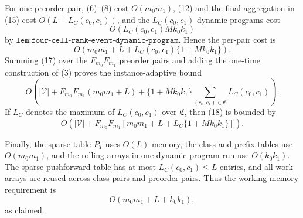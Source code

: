 For one preorder pair, (6)--(8) cost \(O(m_0m_1)\), (12) and the final aggregation in (15) cost \(O(L+L_C(c_0,c_1))\), and the \(L_C(c_0,c_1)\) dynamic programs cost
\[
O\!\left(L_C(c_0,c_1)Mk_0k_1\right)
\tag{16}
\]
by \(\texttt{lem:four-cell-rank-event-dynamic-program}\). Hence the per-pair cost is
\[
O\!\left(m_0m_1+L+
L_C(c_0,c_1)\{1+Mk_0k_1\}\right).
\tag{17}
\]
Summing (17) over the \(F_{m_0}F_{m_1}\) preorder pairs and adding the one-time construction of (3) proves the instance-adaptive bound
\[
O\!\left(
|\mathcal V|+F_{m_0}F_{m_1}(m_0m_1+L)
+\{1+Mk_0k_1\}
\sum_{(c_0,c_1)\in\mathfrak C}L_C(c_0,c_1)
\right).
\tag{18}
\]
If \(L_C\) denotes the maximum of \(L_C(c_0,c_1)\) over \(\mathfrak C\), then (18) is bounded by
\[
O\!\left(|\mathcal V|+F_{m_0}F_{m_1}
\left[m_0m_1+L+L_C\{1+Mk_0k_1\}\right]\right).
\tag{19}
\]

Finally, the sparse table \(P_T\) uses \(O(L)\) memory, the class and prefix tables use \(O(m_0m_1)\), and the rolling arrays in one dynamic-program run use \(O(k_0k_1)\). The sparse pushforward table has at most \(L_C(c_0,c_1)\le L\) entries, and all work arrays are reused across class pairs and preorder pairs. Thus the working-memory requirement is
\[
O(m_0m_1+L+k_0k_1),
\]
as claimed.